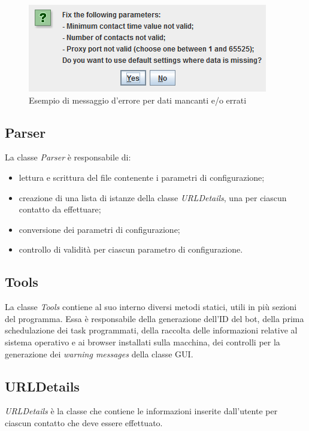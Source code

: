 \begin{figure}[!htb]
        \centering        
        \includegraphics[width=0.6\linewidth]{./imgs/warning}
        \caption{Esempio di messaggio d'errore per dati mancanti e/o errati}
        \label{fig:warning}
\end{figure}

\vspace*{0.5cm}
\subsection{Parser}
La classe \textit{Parser} \`{e} responsabile di:
\begin{itemize}
\item lettura e scrittura del file contenente i parametri di configurazione;
\item creazione di una lista di istanze della classe \textit{URLDetails}, una per ciascun contatto da effettuare;
\item conversione dei parametri di configurazione;
\item controllo di validit\`{a} per ciascun parametro di configurazione.
\end{itemize}

\vspace*{0.5cm}
\subsection{Tools}
La classe \textit{Tools} contiene al suo interno diversi metodi statici, utili in pi\`{u} sezioni del programma.
Essa \`{e} responsabile della generazione dell'ID del bot, della prima schedulazione dei task programmati, della raccolta delle informazioni relative al sistema operativo e ai browser installati sulla macchina, dei controlli per la generazione dei \textit{warning messages} della classe GUI.

\vspace*{0.5cm}
\subsection{URLDetails}
\textit{URLDetails} \`e la classe che contiene le informazioni inserite dall'utente per ciascun contatto che deve essere effettuato.